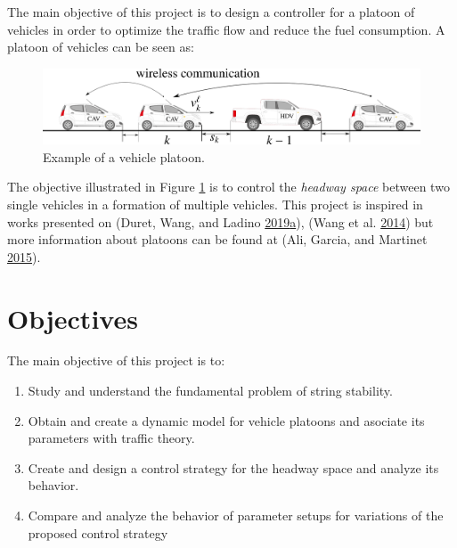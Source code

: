 \documentclass[]{book}
\providecommand{\tightlist}{%
  \setlength{\itemsep}{0pt}\setlength{\parskip}{0pt}}
\theoremstyle{definition}
\theoremstyle{definition}
\theoremstyle{definition}
\theoremstyle{remark}
\begin{document}
The main objective of this project is to design a controller for a
platoon of vehicles in order to optimize the traffic flow and reduce the
fuel consumption. A platoon of vehicles can be seen as:



\begin{figure}

{\centering \includegraphics{images/p2-cavs} 

}

\caption{Example of a vehicle platoon.}\label{fig:cav}
\end{figure}

The objective illustrated in Figure \ref{fig:cav} is to control the
\emph{headway space} between two single vehicles in a formation of
multiple vehicles. This project is inspired in works presented on
(Duret, Wang, and Ladino
\protect\hyperlink{ref-Duret2019:ISTTT}{2019}\protect\hyperlink{ref-Duret2019:ISTTT}{a}),
(Wang et al. \protect\hyperlink{ref-Meng2014b:TR-C}{2014}) but more
information about platoons can be found at (Ali, Garcia, and Martinet
\protect\hyperlink{ref-Ali2015:ITSM}{2015}).

\hypertarget{objectives-1}{%
\section*{Objectives}\label{objectives-1}}

The main objective of this project is to:

\begin{enumerate}
\def\labelenumi{\arabic{enumi}.}
\tightlist
\item
  Study and understand the fundamental problem of string stability.
\item
  Obtain and create a dynamic model for vehicle platoons and asociate
  its parameters with traffic theory.
\item
  Create and design a control strategy for the headway space and analyze
  its behavior.
\item
  Compare and analyze the behavior of parameter setups for variations of
  the proposed control strategy
\end{enumerate}
\end{document}
